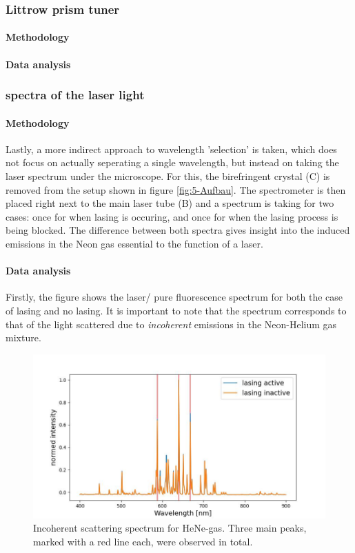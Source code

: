 \documentclass[../main.tex]{subfiles}
\begin{document}
\subsubsection{Littrow prism tuner}
    \paragraph{Methodology}
    \paragraph{Data analysis}

\subsubsection{spectra of the laser light}
    \paragraph{Methodology}
    Lastly, a more indirect approach to wavelength 'selection' is taken, which does not focus on actually seperating a single wavelength, but instead on taking the laser spectrum under the microscope. For this, the birefringent crystal (C) is removed from the setup shown in figure \ref{fig:5-Aufbau}. The spectrometer is then placed right next to the main laser tube (B) and a spectrum is taking for two cases: once for when lasing is occuring, and once for when the lasing process is being blocked. The difference between both spectra gives insight into the induced emissions in the Neon gas essential to the function of a laser.

    \paragraph{Data analysis}

    Firstly, the figure shows the laser/ pure fluorescence spectrum for both the case of lasing and no lasing. It is important to note that the spectrum corresponds to that of the light scattered due to \textit{incoherent} emissions in the Neon-Helium gas mixture.

    \begin{figure}[H]
        \centering 
        \includegraphics[width = 15cm]{Bilddateien/5-NeonSpektren.jpg}
        \caption{Incoherent scattering spectrum for HeNe-gas. Three main peaks, marked with a red line each, were observed in total.}
        \label{fig:5-NeonSpektren}
    \end{figure}
\end{document}
